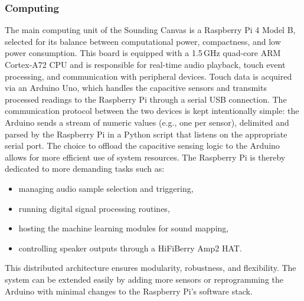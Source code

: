 \documentclass{article}
\begin{document}
\subsubsection{Computing}
The main computing unit of the Sounding Canvas is a Raspberry Pi 4 Model B, selected for its balance between computational power, compactness, and low power consumption. This board is equipped with a 1.5\,GHz quad-core ARM Cortex-A72 CPU and is responsible for real-time audio playback, touch event processing, and communication with peripheral devices. \newline 
Touch data is acquired via an Arduino Uno, which handles the capacitive sensors and transmits processed readings to the Raspberry Pi through a serial USB connection. The communication protocol between the two devices is kept intentionally simple: the Arduino sends a stream of numeric values (e.g., one per sensor), delimited and parsed by the Raspberry Pi in a Python script that listens on the appropriate serial port. \newline 
The choice to offload the capacitive sensing logic to the Arduino allows for more efficient use of system resources. The Raspberry Pi is thereby dedicated to more demanding tasks such as:

\begin{itemize}
	\item managing audio sample selection and triggering,
	\item running digital signal processing routines,
	\item hosting the machine learning modules for sound mapping,
	\item controlling speaker outputs through a HiFiBerry Amp2 HAT.
\end{itemize}
\noindent
This distributed architecture ensures modularity, robustness, and flexibility. The system can be extended easily by adding more sensors or reprogramming the Arduino with minimal changes to the Raspberry Pi's software stack.
\end{document}
